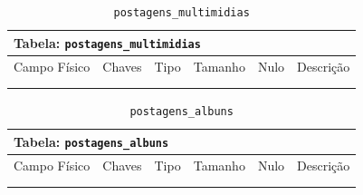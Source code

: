 \documentclass[12pt,a4paper]{article}
\begin{document}
\begin{center}
\begin{table}[h!]
	\caption{\texttt{postagens\_multimidias}}
	\label{tabela:postagensMultimidias}
	\begin{tabular}{|p{2.5cm}|p{1cm}|p{1.25cm}|p{1.75cm}|p{1.25cm}|p{5cm}|}\hline	
		\multicolumn{6}{|p{16cm}|}{\cellcolor{cinzaClaro}  \centering Tabela: \texttt{postagens\_multimidias}} \\ \hline %
		{\small Campo Físico}   & {\small Chaves} & {\small Tipo} & {\small Tamanho} & {\small Nulo} & {\small Descrição}\\\hline %
		
		{\tiny } & {\tiny } & {\tiny } & {\tiny } & {\tiny } &{\tiny }\\\hline
		{\tiny } & {\tiny } & {\tiny } & {\tiny } & {\tiny } &{\tiny }\\\hline
	
			
	\end{tabular}
\end{table}	
\end{center}

\begin{center}
\begin{table}[h!]
	\caption{\texttt{postagens\_albuns}}
	\label{tabela:postagensAlbuns}
	\begin{tabular}{|p{2.5cm}|p{1cm}|p{1.25cm}|p{1.75cm}|p{1.25cm}|p{5cm}|}\hline	
		\multicolumn{6}{|p{16cm}|}{\cellcolor{cinzaClaro}  \centering Tabela: \texttt{postagens\_albuns}} \\ \hline %
		{\small Campo Físico}   & {\small Chaves} & {\small Tipo} & {\small Tamanho} & {\small Nulo} & {\small Descrição}\\\hline %
		
		{\tiny } & {\tiny } & {\tiny } & {\tiny } & {\tiny } &{\tiny }\\\hline
		{\tiny } & {\tiny } & {\tiny } & {\tiny } & {\tiny } &{\tiny }\\\hline
			
	\end{tabular}
\end{table}	
\end{center}
\end{document}
